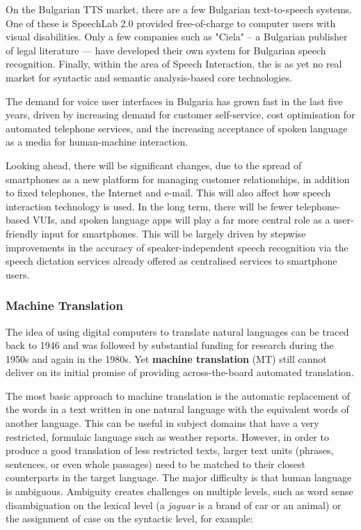 \documentclass[]{../../metanetpaper}
\begin{document}
\begin{multicols}{2}
On the Bulgarian TTS market, there are a few Bulgarian text-to-speech systems. One of these is SpeechLab 2.0 provided free-of-charge to computer users with visual disabilities. Only a few companies such as "Ciela" – a Bulgarian publisher of legal literature — have developed their own system for Bulgarian speech recognition. Finally, within the area of Speech Interaction, the is as yet no real market for syntactic and semantic analysis-based core technologies. 

The demand for voice user interfaces in Bulgaria has grown fast in the last five years, driven by increasing demand for customer self-service, cost optimisation for automated telephone services, and the increasing acceptance of spoken language as a media for human-machine interaction. 

Looking ahead, there will be significant changes, due to the spread of smartphones as a new platform for managing customer relationships, in addition to fixed telephones, the Internet and e-mail. This will also affect how speech interaction technology is used. In the long term, there will be fewer telephone-based VUIs, and spoken language apps will play a far more central role as a user-friendly input for smartphones. This will be largely driven by stepwise improvements in the accuracy of speaker-independent speech recognition via the speech dictation services already offered as centralised services to smartphone users.

\subsubsection{Machine Translation}

The idea of using digital computers to translate natural languages can be traced back to 1946 and was followed by substantial funding for research during the 1950s and again in the 1980s. Yet \textbf{machine translation} (MT) still cannot deliver on its initial promise of providing across-the-board automated translation.


The most basic approach to machine translation is the automatic replacement of the words in a text written in one natural language with the equivalent words of another language. This can be useful in subject domains that have a very restricted, formulaic language such as weather reports.  However, in order to produce a good translation of less restricted texts, larger text units (phrases, sentences, or even whole passages) need to be matched to their closest counterparts in the target language. The major difficulty is that human language is ambiguous. Ambiguity creates challenges on multiple levels, such as word sense disambiguation on the lexical level (a \textit{jaguar} is a brand of car or an animal) or the assignment of case on the syntactic level, for example:


\end{multicols}
\end{document}
